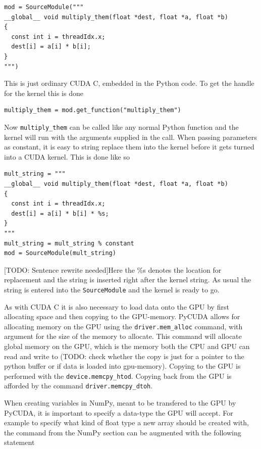 \begin{verbatim}
mod = SourceModule("""
__global__ void multiply_them(float *dest, float *a, float *b)
{
  const int i = threadIdx.x;
  dest[i] = a[i] * b[i];
}
""")
\end{verbatim}

This is just ordinary CUDA C, embedded in the Python code. To get the handle for the kernel this is done

\begin{verbatim}
multiply_them = mod.get_function("multiply_them")
\end{verbatim}

Now \texttt{multiply\_them} can be called like any normal Python function and the kernel will run with the arguments supplied in the call. When passing parameters as constant, it is easy to string replace them into the kernel before it gets turned into a CUDA kernel. This is done like so

\begin{verbatim}
mult_string = """
__global__ void multiply_them(float *dest, float *a, float *b)
{
  const int i = threadIdx.x;
  dest[i] = a[i] * b[i] * %s;
}
"""
mult_string = mult_string % constant
mod = SourceModule(mult_string)
\end{verbatim}

[TODO: Sentence rewrite needed]Here the \%s denotes the location for replacement and the string is inserted right after the kernel string. As usual the string is entered into the \texttt{SourceModule} and the kernel is ready to go.

As with CUDA C it is also necessary to load data onto the GPU by first allocating space and then copying to the GPU-memory. PyCUDA allows for allocating memory on the GPU using the \texttt{driver.mem\_alloc} command, with argument for the size of the memory to allocate. This command will allocate global memory on the GPU, which is the memory both the CPU and GPU can read and write to (TODO: check whether the copy is just for a pointer to the python buffer or if data is loaded into gpu-memory). Copying to the GPU is performed with the \texttt{device.memcpy\_htod}. Copying back from the GPU is afforded by the command \texttt{driver.memcpy\_dtoh}.

When creating variables in NumPy, meant to be transfered to the GPU by PyCUDA, it is important to specify a data-type the GPU will accept. For example to specify what kind of float type a new array should be created with, the command from the NumPy section can be augmented with the following statement

